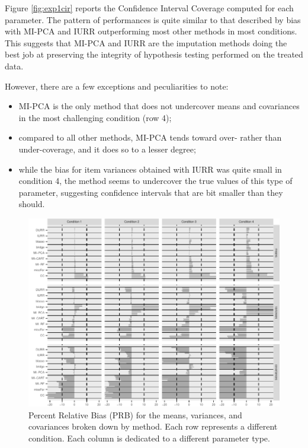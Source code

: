 	Figure \ref{fig:exp1cir} reports the Confidence Interval Coverage computed for each parameter.
	The pattern of performances is quite similar to that described by bias with MI-PCA and IURR 
	outperforming most other methods in most conditions.
	This suggests that MI-PCA and IURR are the imputation methods doing the best job at preserving
	the integrity of hypothesis testing performed on the treated data.

	However, there are a few exceptions and peculiarities to note: 
	\begin{itemize}
	\item MI-PCA is the only method that does not undercover means and covariances in the most challenging condition
		(row 4);
	\item compared to all other methods, MI-PCA tends toward over- rather than under-coverage, and it 
	does so to a lesser degree;
	\item while the bias for item variances obtained with IURR was quite small in condition 4, the method seems 
	to undercover the true values of this type of parameter, suggesting confidence intervals that are bit smaller
	than they should.
	\end{itemize}

\begin{figure}
	\includegraphics[width=\textwidth]{../../output/graphs/exp1_bias.pdf}
\caption{Percent Relative Bias (PRB) for the means, variances, and covariances broken 
	down by method. 
	Each row represents a different condition. 
	Each column is dedicated to a different parameter type.}
\label{fig:exp1bias}
\end{figure}

